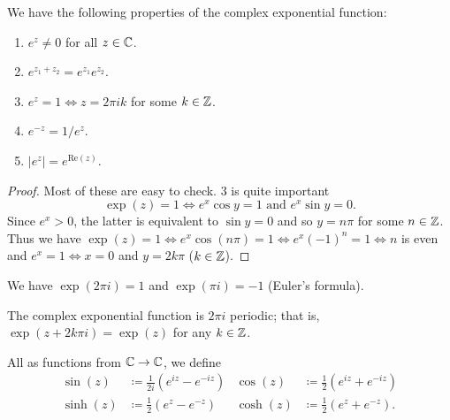 \documentclass[10pt, a4paper]{article}
\begin{document}
\begin{proposition}\label{prop:propsofexp}
    We have the following properties of the complex exponential function:
    \begin{enumerate}[label = \arabic*.]
        \item $e ^ {z} \neq 0$ for all $z \in \mathbb{C}$.

        \item $e ^ {z_1 + z_2} = e ^ {z_1}e ^ {z_2}$.

        \item $e ^ {z} = 1 \iff z = 2\pi ik$ for some $k \in \mathbb{Z}$.

        \item $e ^ {-z} = 1 / e ^ {z}$.

        \item $|e ^ z| = e ^ {\mathrm{Re}(z)}$.
    \end{enumerate}

    \begin{proof}
        Most of these are easy to check.
        $3$ is quite important
        \[
        \exp(z) = 1 \iff e ^ x\cos{y} = 1\text{ and }e ^ x\sin{y} = 0.
        \]
        Since $e ^ x > 0$,
        the latter is equivalent to $\sin{y} = 0$ and so $y = n\pi$ for some $n \in \mathbb{Z}$.
        Thus we have $\exp(z) = 1 \iff e ^ x\cos(n\pi) = 1 \iff e ^ x(-1) ^ n = 1 \iff n$ is even and $e ^ x = 1 \iff x = 0$ and $y = 2k\pi$
        ($k \in \mathbb{Z}$).
    \end{proof}
\end{proposition}

\begin{corollary}\label{cor:expzperiodicity}
    We have $\exp(2\pi i) = 1$ and $\exp(\pi i) = -1$
    (Euler's formula).
\end{corollary}

\begin{corollary}
    The complex exponential function is $2\pi i$ periodic;
    that is,
    $\exp(z + 2k\pi i) = \exp(z)$ for any $k \in \mathbb{Z}$.
\end{corollary}

\begin{definition}
    All as functions from $\mathbb{C} \to \mathbb{C}$,
    we define
    \begin{align*}
        \sin(z) &\coloneqq \frac{1}{2i}(e ^ {iz} - e ^ {-iz}) & \cos(z) &\coloneqq \frac{1}{2}(e ^ {iz} + e ^ {-iz}) \\
        \sinh(z) &\coloneqq \frac{1}{2}(e ^ {z} - e ^ {-z}) & \cosh(z) &\coloneqq \frac{1}{2}(e ^ {z} + e ^ {-z}).
    \end{align*}
\end{definition}
\end{document}
